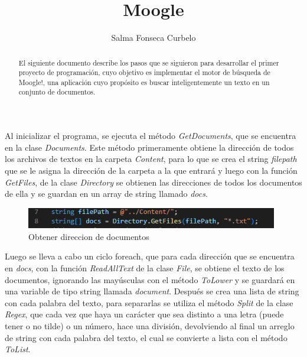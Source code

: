 \documentclass[10pt, letterpaper]{article}
\title{Moogle}
\author{Salma Fonseca Curbelo}
\begin{document}
    
    \maketitle

\begin{abstract}
    El siguiente documento describe los pasos que se siguieron 
    para desarrollar el primer proyecto de programación, 
    cuyo objetivo es  implementar el motor de búsqueda de Moogle!,
    una aplicación cuyo propósito es buscar inteligentemente un texto en un 
    conjunto de documentos.
\end{abstract}


    \newpage
        
        Al inicializar el programa, se ejecuta el método \textit{GetDocuments}, que se encuentra en la 
        clase \textit{Documents}. Este método primeramente obtiene la dirección de todos los archivos de
        textos en la carpeta \textit{Content}, para lo que se crea el string \textit{filepath} que se le asigna la 
        dirección de la carpeta a la que entrará y luego con la función \textit{GetFiles}, de la clase
        \textit{Directory} se obtienen las direcciones de todos los documentos de ella y se guardan en
        un array de string llamado \textit{docs}.

        \begin{figure}[h]

            \centering
            \label{imag: obtdocs}
            \includegraphics[width=11cm]{ObtenerDocs.png}
            \caption[]{\footnotesize Obtener direccion de documentos}

        \end{figure}

        Luego se lleva a cabo un ciclo foreach, que para cada dirección que se encuentra en \textit{docs},
        con la función \textit{ReadAllText} de la clase \textit{File}, se obtiene el texto de los documentos, 
        ignorando las mayúsculas con el método \textit{ToLower} y se guardará en una variable de tipo string 
        llamada \textit{document}. Después se crea una lista de string con cada palabra del texto,
        para separarlas se utiliza el método \textit{Split} de la clase \textit{Regex}, que cada vez que haya un 
        carácter que sea distinto a una letra (puede tener o no tilde) o un número, hace una división,
        devolviendo al final un arreglo de string con cada palabra del texto, el cual se convierte a
        lista con el método \textit{ToList}.
\end{document}
